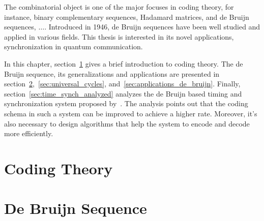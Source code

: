 The combinatorial object is one of the major focuses in coding theory, for instance, binary complementary sequences, Hadamard matrices, and de Bruijn sequences, $\ldots$. Introduced in 1946, de Bruijn sequences have been well studied and applied in various fields. This thesis is interested in its novel applications, synchronization in quantum communication.

In this chapter, section~\ref{sec:coding_theory} gives a brief introduction to coding theory. The de Bruijn sequence, its generalizations and applications are presented in section~\ref{sec:debbruijn},~\ref{sec:universal_cycles}, and~\ref{sec:applications_de_bruijn}. Finally, section~\ref{sec:time_synch_analyzed} analyzes the de Bruijn based timing and synchronization system proposed by~\citeauthor{zhang2021timing}. The analysis points out that the coding schema in such a system can be improved to achieve a higher rate. Moreover, it's also necessary to design algorithms that help the system to encode and decode more efficiently.




\section{Coding Theory}\label{sec:coding_theory}


\section{De Bruijn Sequence}\label{sec:debbruijn}


